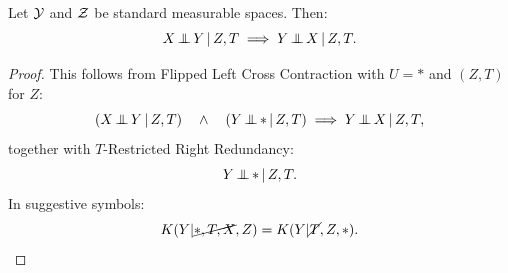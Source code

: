 \begin{Lem}
    Let $\Ycal$ and $\Zcal$ be standard measurable spaces. 
    Then:
    \[X \Indep  Y \given Z,T \implies Y \Indep X \given Z,T.\]
\begin{proof}
    This follows from Flipped Left Cross Contraction with $U=\ast$ and $(Z,T)$ for $Z$:
\[ \lp X \Indep Y \given Z,T \rp \quad \land\quad \lp Y \Indep \ast \given Z,T \rp \implies Y \Indep X \given Z,T, \]
together with $T$-Restricted Right Redundancy:
\[ Y \Indep \ast \given Z,T.  \]
In suggestive symbols:
\[ K(Y|\cancel{\ast,T,X},Z) = K(Y|\cancel{T},Z,\ast).\]
\end{proof}
\end{Lem}
